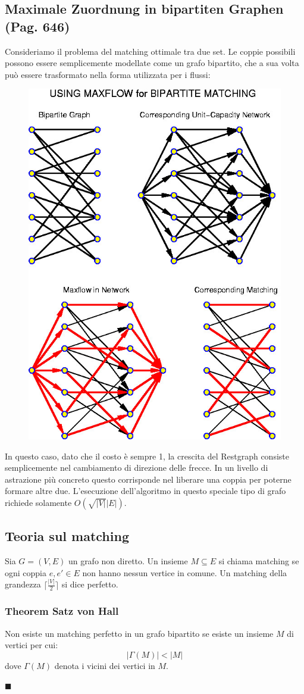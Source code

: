 \documentclass[a4paper]{book}
\newenvironment{mytheorem}[1]{\subsubsection*{Theorem #1}}{\begin{flushright}$\blacksquare$\end{flushright}}
\begin{document}
\subsection{Maximale Zuordnung in bipartiten Graphen (Pag. 646)}
Consideriamo il problema del matching ottimale tra due set. Le coppie possibili possono essere semplicemente modellate come un grafo bipartito, che a sua volta può essere trasformato nella forma utilizzata per i flussi:
\begin{figure}[H]
\centering
\includegraphics[scale=0.45]{Figures/matching.jpg}
\end{figure}
In questo caso, dato che il costo è sempre 1, la crescita del Restgraph consiste semplicemente nel cambiamento di direzione delle frecce. In un livello di astrazione più concreto questo corrisponde nel liberare una coppia per poterne formare altre due. L'esecuzione dell'algoritmo in questo speciale tipo di grafo richiede solamente $O(\sqrt{|V|}|E|)$.
\subsection{Teoria sul matching}
Sia $G=(V,E)$ un grafo non diretto. Un insieme $M\subseteq E$ si chiama matching se ogni coppia $e,e' \in E$ non hanno nessun vertice in comune. Un matching della grandezza $\lceil \frac{|V|}{2} \rceil$ si dice perfetto.
\begin{mytheorem}{Satz von Hall}
Non esiste un matching perfetto in un grafo bipartito se esiste un insieme $M$ di vertici per cui:
$$|\Gamma (M)|<|M|$$
dove $\Gamma (M)$ denota i vicini dei vertici in $M$.
\end{mytheorem}
\end{document}
